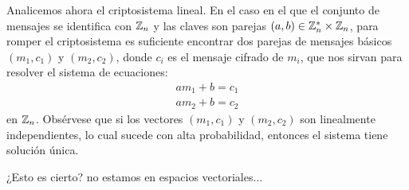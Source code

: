 Analicemos ahora el criptosistema lineal. En el caso en el que el conjunto de mensajes se identifica con $\mathbb{Z}_n$ y las claves son parejas $(a,b)\in\mathbb{Z}^*_n\times\mathbb{Z}_n$, para romper el criptosistema es suficiente encontrar dos parejas de mensajes básicos $(m_1,c_1)$ y $(m_2,c_2)$, donde $c_i$ es el mensaje cifrado de $m_i$, que nos sirvan para resolver el sistema de ecuaciones:
\begin{gather*}
    am_1 + b = c_1 \\
    am_2 + b = c_2
\end{gather*}
en $\mathbb{Z}_n$. Obsérvese que si los vectores $(m_1,c_1)$ y $(m_2, c_2)$ son linealmente independientes, lo cual sucede con alta probabilidad, entonces el sistema tiene solución única.
\begin{reader}
¿Esto es cierto? no estamos en espacios vectoriales...
\end{reader}

